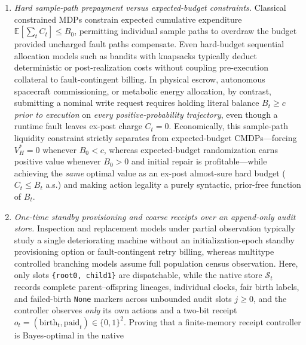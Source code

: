 \documentclass[11pt,letterpaper]{article}
\providecommand{\tightlist}{\setlength{\itemsep}{2pt}\setlength{\parskip}{0pt}}
\begin{document}
\begin{enumerate}
\def\labelenumi{\arabic{enumi}.}
\tightlist
\item
  \emph{Hard sample-path prepayment versus expected-budget constraints.}
  Classical constrained MDPs \citep{altman1999, feinberg2000} constrain
  expected cumulative expenditure \(\mathbb{E}[\sum_t C_t] \le B_0\),
  permitting individual sample paths to overdraw the budget provided
  uncharged fault paths compensate. Even hard-budget sequential
  allocation models such as bandits with knapsacks
  \citep{badanidiyuru2018, besbesZeevi2009} typically deduct
  deterministic or post-realization costs without coupling pre-execution
  collateral to fault-contingent billing. In physical escrow, autonomous
  spacecraft commissioning, or metabolic energy allocation, by contrast,
  submitting a nominal write request requires holding literal balance
  \(B_t \ge c\) \emph{prior to execution} on \emph{every
  positive-probability trajectory}, even though a runtime fault leaves
  ex-post charge \(C_t = 0\). Economically, this sample-path liquidity
  constraint strictly separates from expected-budget CMDPs---forcing
  \(V_H^* = 0\) whenever \(B_0 < c\), whereas expected-budget
  randomization earns positive value whenever \(B_0 > 0\) and initial
  repair is profitable---while achieving the \emph{same} optimal value
  as an ex-post almost-sure hard budget (\(C_t \le B_t\) a.s.) and
  making action legality a purely syntactic, prior-free function of
  \(B_t\).
\item
  \emph{One-time standby provisioning and coarse receipts over an
  append-only audit store.} Inspection and replacement models under
  partial observation
  \citep{eckles1968, ross1970, ross1971, white1979, monahan1982, makisJiang2003}
  typically study a single deteriorating machine without an
  initialization-epoch standby provisioning option or fault-contingent
  retry billing, whereas multitype controlled branching models
  \citep{jagers1975, pliska1976, rothblumWhittle1982, haccou2005, gonzalez2018}
  assume full population census observation. Here, only slots
  \texttt{\{root0,\ child1\}} are dispatchable, while the native store
  \(\mathcal{S}_t\) records complete parent--offspring lineages,
  individual clocks, fair birth labels, and failed-birth \texttt{None}
  markers across unbounded audit slots \(j \ge 0\), and the controller
  observes \emph{only} its own actions and a two-bit receipt
  \(o_t = (\mathrm{birth}_t, \mathrm{paid}_t) \in \{0,1\}^2\). Proving
  that a finite-memory receipt controller is Bayes-optimal in the native

\end{enumerate}
\end{document}
